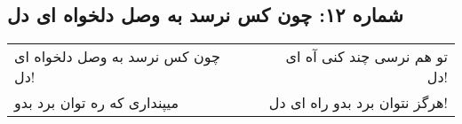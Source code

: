\begin{center}
\section*{شماره ۱۲: چون کس نرسد به وصل دلخواه ای دل}
\label{sec:012}
\begin{longtable}{l p{0.5cm} r}
چون کس نرسد به وصل دلخواه ای دل!
&&
تو هم نرسی چند کنی آه ای دل!
\\
میپنداری که ره توان برد بدو
&&
هرگز نتوان برد بدو راه ای دل!
\\
\end{longtable}
\end{center}
